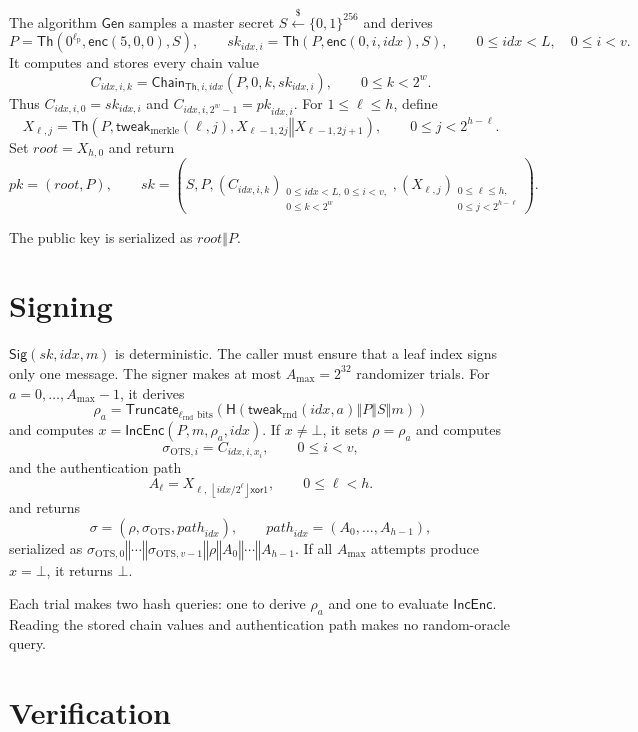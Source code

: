 \documentclass[11pt]{article}
\theoremstyle{definition}
\theoremstyle{plain}
\theoremstyle{remark}
\newcommand{\bits}[1]{\{0,1\}^{#1}}
\newcommand{\getsr}{\stackrel{\$}{\gets}}
\newcommand{\Th}{\mathsf{Th}}
\newcommand{\IncEnc}{\mathsf{IncEnc}}
\newcommand{\Gen}{\mathsf{Gen}}
\newcommand{\Sig}{\mathsf{Sig}}
\newcommand{\Chain}{\mathsf{Chain}}
\newcommand{\hash}{\mathsf{H}}
\newcommand{\Truncate}{\mathsf{Truncate}}
\newcommand{\concat}{\mathbin\Vert}
\newcommand{\idx}{\mathit{idx}}
\newcommand{\sk}{\mathit{sk}}
\newcommand{\pk}{\mathit{pk}}
\newcommand{\rootnode}{\mathit{root}}
\newcommand{\lpar}{\ell_{\mathrm{p}}}
\newcommand{\lrnd}{\ell_{\mathrm{rnd}}}
\newcommand{\amax}{A_{\max}}
\begin{document}
The algorithm $\Gen$ samples a master secret $S\getsr\bits{256}$ and derives
\[
  P=\Th\!\left(0^{\lpar},\mathsf{enc}(5,0,0),S\right),
  \qquad
  \mathit{sk}_{\idx,i}=\Th\!\left(P,\mathsf{enc}(0,i,\idx),S\right),
  \qquad 0\leq\idx<L,\quad 0\leq i<v.
\]
It computes and stores every chain value
\[
  C_{\idx,i,k}=\Chain_{\Th,i,\idx}(P,0,k,\mathit{sk}_{\idx,i}),
  \qquad 0\leq k<2^w.
\]
Thus $C_{\idx,i,0}=\mathit{sk}_{\idx,i}$ and $C_{\idx,i,2^w-1}=\mathit{pk}_{\idx,i}$. For $1\leq\ell\leq h$, define
\[
  X_{\ell,j}=\Th\!\left(P,\mathsf{tweak}_{\mathrm{merkle}}(\ell,j),X_{\ell-1,2j}\concat X_{\ell-1,2j+1}\right),
  \qquad 0\leq j<2^{h-\ell}.
\]
Set $\rootnode=X_{h,0}$ and return
\[
  \pk=(\rootnode,P),
  \qquad
  \sk=\left(S,P,(C_{\idx,i,k})_{\substack{0\leq\idx<L,\,0\leq i<v,\\0\leq k<2^w}},(X_{\ell,j})_{\substack{0\leq\ell\leq h,\\0\leq j<2^{h-\ell}}}\right).
\]

The public key is serialized as $\rootnode\concat P$.

\section{Signing}

$\Sig(\sk,\idx,m)$ is deterministic. The caller must ensure that a leaf index signs only one message. The signer makes at most $\amax=2^{32}$ randomizer trials. For $a=0,\ldots,\amax-1$, it derives
\[
  \rho_a=\Truncate_{\lrnd\text{ bits}}\!\left(\hash(\mathsf{tweak}_{\mathrm{rnd}}(\idx,a)\concat P\concat S\concat m)\right)
\]
and computes $x=\IncEnc(P,m,\rho_a,\idx)$. If $x\neq\bot$, it sets $\rho=\rho_a$ and computes
\[
  \sigma_{\mathrm{OTS},i}=C_{\idx,i,x_i},
  \qquad 0\leq i<v,
\]
and the authentication path
\[
  A_\ell=X_{\ell,\,\left\lfloor\idx/2^\ell\right\rfloor\mathbin{\mathsf{xor}}1},
  \qquad 0\leq\ell<h.
\]
and returns
\[
  \sigma=(\rho,\sigma_{\mathrm{OTS}},\mathit{path}_{\idx}),
  \qquad
  \mathit{path}_{\idx}=(A_0,\ldots,A_{h-1}),
\]
serialized as $\sigma_{\mathrm{OTS},0}\concat\cdots\concat\sigma_{\mathrm{OTS},v-1}\concat\rho\concat A_0\concat\cdots\concat A_{h-1}$. If all $\amax$ attempts produce $x=\bot$, it returns $\bot$.

Each trial makes two hash queries: one to derive $\rho_a$ and one to evaluate $\IncEnc$. Reading the stored chain values and authentication path makes no random-oracle query.

\section{Verification}
\end{document}
